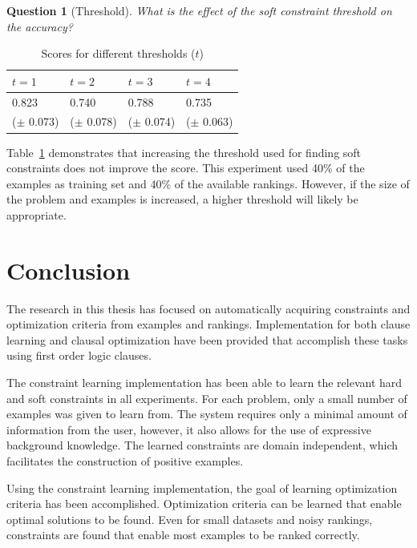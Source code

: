 \documentclass[letterpaper]{article}
\newtheorem{question}{Question}
\theoremstyle{definition}
\begin{document}
\begin{question}[Threshold]
  What is the effect of the soft constraint threshold on the accuracy?
\end{question}
  \begin{table}
    \caption{Scores for different thresholds ($t$)}
    \begin{tabularx}{\linewidth}{XXXX}
      $t = 1$ & $t = 2$ & $t = 3$ & $t = 4$ \\
      \toprule
     0.823 & 0.740 & 0.788 & 0.735 \\
     ($\pm$ 0.073)&
($\pm$ 0.078)&
($\pm$ 0.074)&
($\pm$ 0.063)
    \end{tabularx}
    \label{tbl:limiet}
  \end{table}

Table~\ref{tbl:limiet} demonstrates that increasing the threshold used for finding soft constraints does not improve the score.
This experiment used 40\% of the examples as training set and 40\% of the available rankings.
However, if the size of the problem and examples is increased, a higher threshold will likely be appropriate.


\section{Conclusion}
The research in this thesis has focused on automatically acquiring constraints and optimization criteria from examples and rankings.
Implementation for both clause learning and clausal optimization have been provided that accomplish these tasks using first order logic clauses.

The constraint learning implementation has been able to learn the relevant hard and soft constraints in all experiments.
For each problem, only a small number of examples was given to learn from.
The system requires only a minimal amount of information from the user, however, it also allows for the use of expressive background knowledge.
The learned constraints are domain independent, which facilitates the construction of positive examples.

Using the constraint learning implementation, the goal of learning optimization criteria has been accomplished.
Optimization criteria can be learned that enable optimal solutions to be found.
Even for small datasets and noisy rankings, constraints are found that enable most examples to be ranked correctly.
\end{document}
